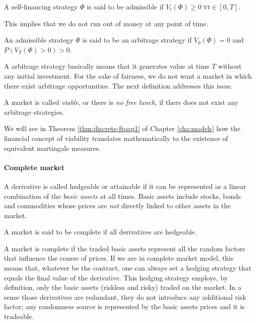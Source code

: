 \begin{dfn}
	A self-financing strategy $ \Phi $ is said to be admissible if $ V_t( \Phi ) \ge 0 \  \forall t \in [0, T] $.
\end{dfn}
This implies that we do not run out of money at any point of time.

\begin{dfn}
	An admissible strategy $ \Phi $ is said to be an arbitrage strategy if $ V_0( \Phi ) = 0 $ and $ P( V_T( \Phi ) > 0 ) > 0 $.
\end{dfn}
A arbitrage strategy basically means that it generates value at time $ T $ without any initial investment. For the sake of fairness, we do not want a market in which there exist arbitrage opportunities. The next definition addresses this issue.

\begin{dfn}
	A market is called \emph{viable}, or there is \emph{no free lunch}, if there does not exist any arbitrage strategies.
\end{dfn}

We will see in Theorem \ref{thm:discrete-ftoap1} of Chapter \ref{cha:models} how the financial concept of viability translates mathematically to the existence of equivalent martingale measures.


\paragraph{Complete market}

\begin{dfn}
	A derivative is called hedgeable or attainable if it can be represented as a linear combination of the \emph{basic assets} at all times. Basic assets include stocks, bonds and commodities whose prices are \emph{not} directly linked to other assets in the market.
\end{dfn}

\begin{dfn}
	A market is said to be complete if all derivatives are hedgeable.
\end{dfn}

A market is complete if the traded basic assets represent all the random factors that influence the course of prices. If we are in complete market model, this means that, whatever be the contract, one can always set a hedging strategy that equals the final value of the derivative. This hedging strategy employs, by definition, only the basic assets (riskless and risky) traded on the market. In a sense those derivatives are redundant, they do not introduce any additional risk factor; any randomness source is represented by the basic assets prices and it is tradeable.

